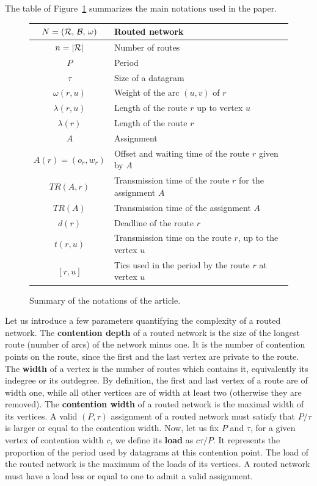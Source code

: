 \documentclass[a4paper,10pt]{journal}
\begin{document}
      The table of Figure~\ref{tab:summary} summarizes the main notations used in the paper.
    \begin{figure}
      \begin{center}
    \begin{tabularx}{\textwidth}{|c|X|}
    \hline
     $N = (\cal{R},\,\cal{B},\,\omega)$ & Routed network \\
     \hline
     $n = |\cal{R}|$ & Number of routes\\
     \hline
     $P$ & Period\\
     \hline
     $\tau$ & Size of a datagram\\
     \hline
     $\omega(r,u)$ & Weight of the arc $(u,v)$ of $r$ \\
     \hline
     $\lambda(r,u)$ & Length of the route $r$ up to vertex $u$\\
     \hline
     $\lambda(r)$ & Length of the route $r$\\
     \hline 
     $A$ & Assignment\\
     \hline 
     $A(r) = (o_r,w_r)$ & Offset and waiting time of the route $r$ given by $A$ \\
     \hline 
     $TR(A,r)$& Transmission time of the route $r$ for the assignment $A$\\
     \hline 
     $TR(A)$& Transmission time of the assignment $A$\\
     \hline
     $d(r)$ & Deadline of the route $r$\\
     \hline
	 $t(r,u)$ & Transmission time on the route $r$, up to the vertex $u$\\
     \hline
     $ [r,u]$ & Tics used in the period by the route $r$ at vertex $u$\\
     \hline
      \end{tabularx}
      \end{center}
      \caption{Summary of the notations of the article.}\label{tab:summary}
    \end{figure}
  	
  	Let us introduce a few parameters quantifying the complexity of a routed network.
	The \textbf{contention depth} of a routed network is the size of the longest route (number of arcs) of the network minus one. It is the number of contention points on the route, since the first and the last vertex are private to the route. The \textbf{width} of a vertex is the number of routes which contains it, equivalently its indegree or its outdegree. By definition, 
	the first and last vertex of a route are of width one, while all other vertices are of width at least two (otherwise they are removed).
	The \textbf{contention width} of a routed network is the maximal width of its vertices. 
	A valid $(P,\tau)$ assignment of a routed network must satisfy that $P/\tau$ is larger or equal to the contention width. Now, let us fix $P$ and $\tau$, for a given vertex of contention width $c$, we define its \textbf{load} as $c\tau/P$. It represents the proportion of the period used by datagrams at this contention point. The load of the routed network is the maximum of the loads of its vertices. A routed network must have a load less or equal to one to admit a valid assignment.
\end{document}
